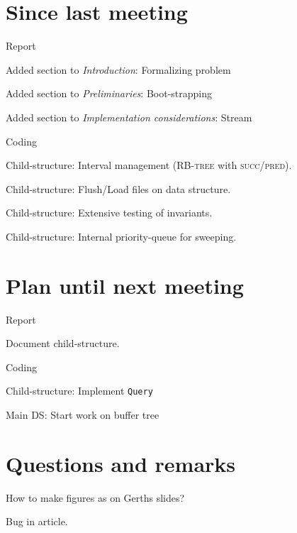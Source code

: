 \documentclass[a4paper,11pt,agenda]{meetingmins}
\begin{document}
\maketitle

\section{Since last meeting}
\begin{items}
\item Report
	\begin{items}
		\item Added section to \textit{Introduction}: Formalizing problem
		\item Added section to \textit{Preliminaries}: Boot-strapping
		\item Added section to \textit{Implementation considerations}: Stream
	\end{items}
\item Coding
	\begin{items}
		\item Child-structure: Interval management (\textsc{RB-tree} with \textsc{succ}/\textsc{pred}).
		\item Child-structure: Flush/Load files on data structure.
		\item Child-structure: Extensive testing of invariants.
		\item Child-structure: Internal priority-queue for sweeping.
	\end{items}
\end{items}

\section{Plan until next meeting}
\begin{items}
\item Report
	\begin{items}
		\item Document child-structure.
	\end{items}
\item Coding
	\begin{items}
		\item Child-structure: Implement \texttt{Query}
		\item Main DS: Start work on buffer tree
	\end{items}
\end{items}

\section{Questions and remarks}
\begin{items}
	\item How to make figures as on Gerths slides?
	\item Bug in article.
\end{items}
\end{document}
